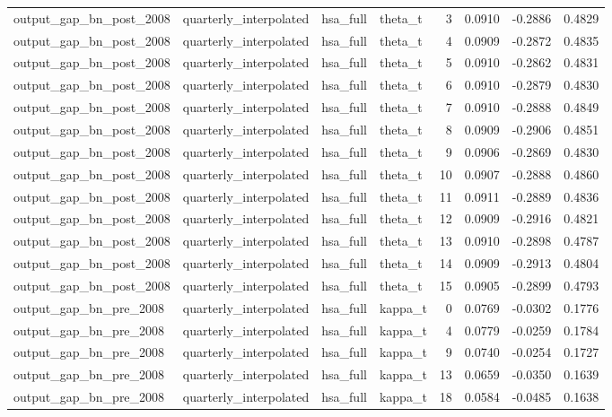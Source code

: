 \begin{tabular}{llllrrrr}
output\_gap\_bn\_post\_2008 & quarterly\_interpolated & hsa\_full & theta\_t & 3 & 0.0910 & -0.2886 & 0.4829 \\
output\_gap\_bn\_post\_2008 & quarterly\_interpolated & hsa\_full & theta\_t & 4 & 0.0909 & -0.2872 & 0.4835 \\
output\_gap\_bn\_post\_2008 & quarterly\_interpolated & hsa\_full & theta\_t & 5 & 0.0910 & -0.2862 & 0.4831 \\
output\_gap\_bn\_post\_2008 & quarterly\_interpolated & hsa\_full & theta\_t & 6 & 0.0910 & -0.2879 & 0.4830 \\
output\_gap\_bn\_post\_2008 & quarterly\_interpolated & hsa\_full & theta\_t & 7 & 0.0910 & -0.2888 & 0.4849 \\
output\_gap\_bn\_post\_2008 & quarterly\_interpolated & hsa\_full & theta\_t & 8 & 0.0909 & -0.2906 & 0.4851 \\
output\_gap\_bn\_post\_2008 & quarterly\_interpolated & hsa\_full & theta\_t & 9 & 0.0906 & -0.2869 & 0.4830 \\
output\_gap\_bn\_post\_2008 & quarterly\_interpolated & hsa\_full & theta\_t & 10 & 0.0907 & -0.2888 & 0.4860 \\
output\_gap\_bn\_post\_2008 & quarterly\_interpolated & hsa\_full & theta\_t & 11 & 0.0911 & -0.2889 & 0.4836 \\
output\_gap\_bn\_post\_2008 & quarterly\_interpolated & hsa\_full & theta\_t & 12 & 0.0909 & -0.2916 & 0.4821 \\
output\_gap\_bn\_post\_2008 & quarterly\_interpolated & hsa\_full & theta\_t & 13 & 0.0910 & -0.2898 & 0.4787 \\
output\_gap\_bn\_post\_2008 & quarterly\_interpolated & hsa\_full & theta\_t & 14 & 0.0909 & -0.2913 & 0.4804 \\
output\_gap\_bn\_post\_2008 & quarterly\_interpolated & hsa\_full & theta\_t & 15 & 0.0905 & -0.2899 & 0.4793 \\
output\_gap\_bn\_pre\_2008 & quarterly\_interpolated & hsa\_full & kappa\_t & 0 & 0.0769 & -0.0302 & 0.1776 \\
output\_gap\_bn\_pre\_2008 & quarterly\_interpolated & hsa\_full & kappa\_t & 4 & 0.0779 & -0.0259 & 0.1784 \\
output\_gap\_bn\_pre\_2008 & quarterly\_interpolated & hsa\_full & kappa\_t & 9 & 0.0740 & -0.0254 & 0.1727 \\
output\_gap\_bn\_pre\_2008 & quarterly\_interpolated & hsa\_full & kappa\_t & 13 & 0.0659 & -0.0350 & 0.1639 \\
output\_gap\_bn\_pre\_2008 & quarterly\_interpolated & hsa\_full & kappa\_t & 18 & 0.0584 & -0.0485 & 0.1638 \\

\end{tabular}
